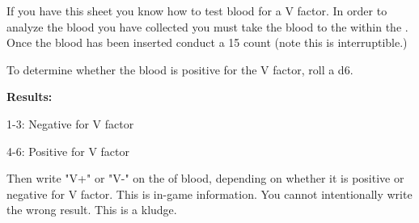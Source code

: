 \documentclass[green]{guildcamp4}
\begin{document}
\name{\gVFactor{}}

If you have this sheet you know how to test blood for a V factor. In order to analyze the blood you have collected you must take the blood to the \sBloodAnalyzer{} within the \pBioLabC{}. 
Once the blood has been inserted conduct a 15 count (note this is interruptible.) 

To determine whether the blood is positive for the V factor, roll a d6.

{\bf Results:}

1-3: Negative for V factor

4-6: Positive for V factor

Then write "V+" or "V-" on the \iTestTube{} of blood, depending on whether it is positive or negative for V factor. This is in-game information. You cannot intentionally write the wrong result. This is a kludge.
\end{document}
